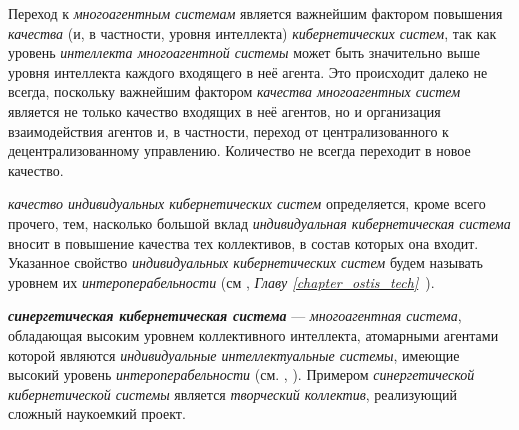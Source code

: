 {\label{sec_mas_overall_quality}} 

Переход к \textit{многоагентным системам} является важнейшим фактором повышения \textit{качества} (и, в частности, уровня интеллекта) \textit{кибернетических систем}, так как уровень \textit{интеллекта многоагентной системы} может быть значительно выше уровня интеллекта каждого входящего в неё агента. 
Это происходит далеко не всегда, поскольку важнейшим фактором \textit{качества многоагентных систем} является не только качество входящих в неё агентов, но и организация взаимодействия агентов и, в частности, переход от централизованного к децентрализованному управлению. 
Количество не всегда переходит в новое качество.

\textit{качество индивидуальных кибернетических систем} определяется, кроме всего прочего, тем, насколько большой вклад \textit{индивидуальная кибернетическая система} вносит в повышение качества тех коллективов, в состав которых она входит.
Указанное свойство \textit{индивидуальных кибернетических систем} будем называть уровнем их \textit{интероперабельности} (см , \textit{Главу \ref{chapter_ostis_tech}~}).

\textbf{\textit{синергетическая кибернетическая система}} --- \textit{многоагентная система}, обладающая высоким уровнем коллективного интеллекта, атомарными агентами которой являются \textit{индивидуальные интеллектуальные системы}, имеющие высокий уровень \textit{интероперабельности} (см. , ).
Примером \textit{синергетической кибернетической системы} является \textit{творческий коллектив}, реализующий сложный наукоемкий проект.

